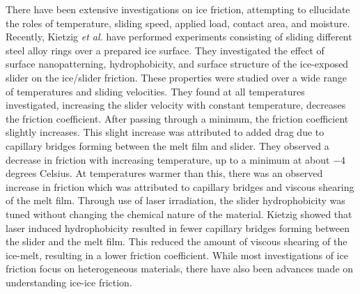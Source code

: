 There have been extensive investigations on ice friction, attempting
to ellucidate the roles of
temperature\cite{Roberts1981,Higgins2008,Bowden1939,Evans1976,Derjaguin1988,Liang2003},
sliding speed\cite{Evans1976,Derjaguin1988,Liang2003}, applied
load\cite{Buhl2001,Bowden1939,Derjaguin1988,Baurle2006,Oksanen1982},
contact area\cite{Bowden1939,Baurle2007}, and
moisture\cite{Calabrese1980}. Recently, Kietzig \textit{et al.} have
performed experiments consisting of sliding different steel alloy
rings over a prepared ice surface.\cite{Kietzig2009} They investigated
the effect of surface nanopatterning, hydrophobicity, and surface
structure of the ice-exposed slider on the ice/slider friction.  These
properties were studied over a wide range of temperatures and sliding
velocities. They found at all temperatures investigated, increasing
the slider velocity with constant temperature, decreases the friction
coefficient. After passing through a minimum, the friction coefficient
slightly increases. This slight increase was attributed to added drag
due to capillary bridges forming between the melt film and
slider. They observed a decrease in friction with increasing
temperature, up to a minimum at about $-4$ degrees Celsius. At
temperatures warmer than this, there was an observed increase in
friction which was attributed to capillary bridges and viscous
shearing of the melt film.  Through use of laser irradiation, the
slider hydrophobicity was tuned without changing the chemical nature
of the material. Kietzig showed that laser induced hydrophobicity
resulted in fewer capillary bridges forming between the slider and the
melt film. This reduced the amount of viscous shearing of the
ice-melt, resulting in a lower friction coefficient.
While most investigations of ice friction focus on heterogeneous
materials\cite{Bowden1939,Evans1976,Derjaguin1988,Liang2003,Liang2005,Baurle2006,Baurle2007,Kietzig2009,Kietzig2010},
there have also been advances made on understanding ice-ice friction\cite{Oksanen1982,Kennedy2000,Maeno2004,Fortt2007,Fortt2011,Lishman2011,Samadashvili2013}.

